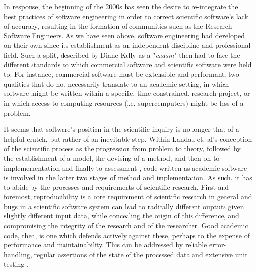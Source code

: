 In response, the beginning of the 2000s has seen the desire to re-integrate the best practices of software engineering in order to correct scientific software's lack of accuracy, resulting in the formation of communities such as the Research Software Engineers\citep{woolston_why_2022}. As we have seen above, software engineering had developed on their own since its establishment as an independent discipline and professional field. Such a split, described by Diane Kelly as a "\emph{chasm}" \citep{kelly_software_2007} then had to face the different standards to which commercial software and scientific software were held to. For instance, commercial software must be extensible and performant, two qualities that do not necessarily translate to an academic setting, in which software might be written within a specific, time-constrained, research project, or in which access to computing resources (i.e. supercomputers) might be less of a problem.

It seems that software's position in the scientific inquiry is no longer that of a helpful crutch, but rather of an inevitable step. Within Landau et. al's conception of the scientific process as the progression from problem to theory, followed by the establishment of a model, the devising of a method, and then on to implemementation and finally to assessment \citep{landau_survey_2011}, code written as academic software is involved in the latter two stages of  method and implementation. As such, it has to abide by the processes and requirements of scientific research. First and foremost, reproducibility is a core requirement of scientific research in general and bugs in a scientific software system can lead to radically different ouptuts given slightly different input data, while concealing the origin of this difference, and compromising the integrity of the research and of the researcher. Good academic code, then, is one which defends actively against these, perhaps to the expense of performance and maintainability. This can be addressed by reliable error-handling, regular assertions of the state of the processed data and extensive unit testing \citep{wilson_best_2014}.

